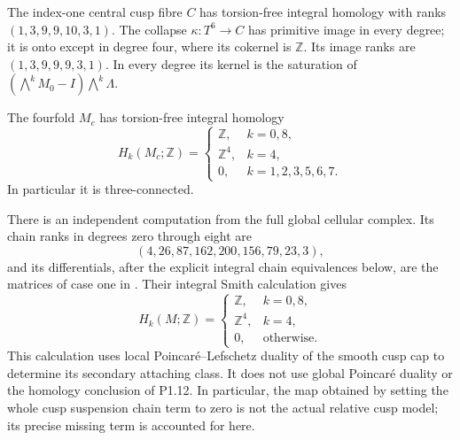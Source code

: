 \begin{theorem}\label{night:P1.11}
The index-one central cusp fibre $C$ has torsion-free integral homology
with ranks $(1,3,9,9,10,3,1)$.
The collapse $\kappa:T^6\to C$ has primitive image in every degree;
it is onto except in degree four, where its cokernel is $\mathbb Z$.
Its image ranks are $(1,3,9,9,9,3,1)$.
In every degree its kernel is the saturation of
$(\bigwedge^kM_0-I)\bigwedge^k\Lambda$.
\end{theorem}

\begin{theorem}\label{night:P1.12}
The fourfold $M_c$ has torsion-free integral homology
\[
H_k(M_c;\mathbb Z)=
\begin{cases}
\mathbb Z,&k=0,8,\\
\mathbb Z^4,&k=4,\\
0,&k=1,2,3,5,6,7.
\end{cases}
\]
In particular it is three-connected.
\end{theorem}

\begin{theorem}\label{night:P1.19}
There is an independent computation from the full global cellular
complex.  Its chain ranks in degrees zero through eight are
\[
 (4,26,87,162,200,156,79,23,3),
\]
and its differentials, after the explicit integral chain equivalences
below, are the matrices of case one in
.
Their integral Smith calculation gives
\[
 H_k(M;\mathbb Z)=
 \begin{cases}
 \mathbb Z,&k=0,8,\\
 \mathbb Z^4,&k=4,\\
 0,&\text{otherwise}.
 \end{cases}
\]
This calculation uses local Poincar\'e--Lefschetz duality of the
smooth cusp cap to determine its secondary attaching class.  It does
not use global Poincar\'e duality or the homology conclusion of P1.12.
In particular, the map obtained by setting the whole cusp suspension
chain term to zero is not the actual relative cusp model; its precise
missing term is accounted for here.
\end{theorem}


